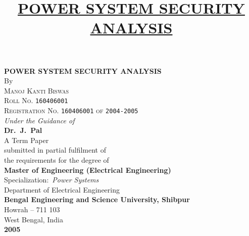 \documentclass[a4paper,11pt]{article}
\title{\underline{\large{POWER SYSTEM SECURITY ANALYSIS}}}
\date{}
\author{}
\begin{document}
\begin{titlepage}
\begin{center}
{\LARGE \textbf{POWER SYSTEM SECURITY ANALYSIS}}\\
\vspace{0.5in}
{\large By}\\
\vspace{10pt}
{\Large \textsc{Manoj Kanti Biswas}}\\
\vspace{3.5pt}
{\large \textsc{Roll No.} \texttt{160406001}}\\
\vspace{3pt}
{\large \textsc{Registration No.} \texttt{160406001} \textsc{of} \texttt{2004-2005}}\\
\vspace{0.5in}
{\large \textit{Under the Guidance of}}\\
\vspace{5pt}
{\Large \textbf{Dr.~J.~Pal}}\\
\vspace{1in}
{\Large A Term Paper}\\
\vspace{3pt}
\Large{submitted in partial fulfilment of}\\
\vspace{3pt}
\Large{the requirements for the degree of}\\
\vspace{4.5pt}
{\Large \textbf{Master of Engineering (Electrical Engineering)}}\\
\vspace{3.5pt}
{\Large Specialization:~\textit{Power Systems}}\\
\vspace{0.5in}
\vspace{0.5in}
{\Large \textsf{Department of Electrical Engineering}}\\
\vspace{3.5pt}
{\Large \textbf{Bengal Engineering and Science University, Shibpur}}\\
\vspace{3.5pt}
{\Large Howrah -- 711 103}\\
\vspace{3.5pt}
{\Large West Bengal, India}\\
\vfill
{\Large \textbf{2005}} 
\end{center}
\end{titlepage}
\end{document}
